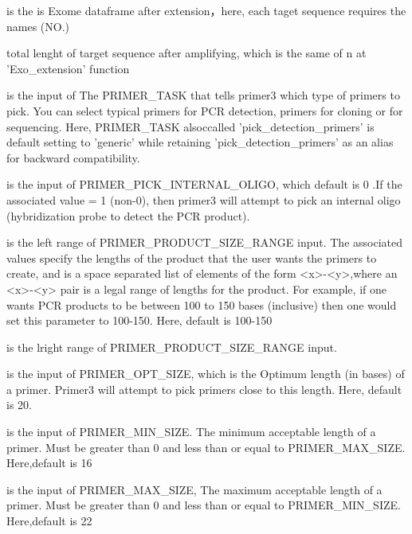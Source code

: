 \documentclass[a4paper]{book}
\begin{document}
\begin{Arguments}
\begin{ldescription}
\item[\code{x}] is the is Exome dataframe after extension，here, each taget sequence requires the names (NO.)

\item[\code{EX}] total lenght of target sequence after amplifying, which is the same of n at 'Exo\_extension' function

\item[\code{generic}] is the input of The PRIMER\_TASK that tells primer3 which type of primers to pick.
You can select typical primers for PCR detection, primers for cloning or for sequencing. Here,
PRIMER\_TASK alsoccalled 'pick\_detection\_primers' is default setting  to 'generic' while
retaining 'pick\_detection\_primers' as an alias for backward compatibility.

\item[\code{oligo}] is the input of PRIMER\_PICK\_INTERNAL\_OLIGO, which default is 0 .If the associated
value = 1 (non-0), then primer3 will attempt to pick an internal oligo (hybridization probe to
detect the PCR product).

\item[\code{rangel}] is the left range  of PRIMER\_PRODUCT\_SIZE\_RANGE input. The associated values specify the lengths
of the product that the user wants the primers to create, and is a space separated list of elements
of the form <x>-<y>,where an <x>-<y> pair is a legal range of lengths for the product. For example,
if one wants PCR products to be between 100 to 150 bases (inclusive) then one would set this parameter
to 100-150. Here, default is 100-150

\item[\code{ranger}] is the lright  range  of PRIMER\_PRODUCT\_SIZE\_RANGE input.

\item[\code{opt\_size}] is the input of PRIMER\_OPT\_SIZE, which is the Optimum length (in bases) of a primer.
Primer3 will attempt to pick primers close to this length. Here, default is 20.

\item[\code{min\_size}] is the input of PRIMER\_MIN\_SIZE. The minimum acceptable length of a primer.
Must be greater than 0 and less than or equal to PRIMER\_MAX\_SIZE. Here,default is 16

\item[\code{max\_size}] is the input of PRIMER\_MAX\_SIZE, The maximum acceptable length of a primer.
Must be greater than 0 and less than or equal to PRIMER\_MIN\_SIZE. Here,default is 22


\end{ldescription}
\end{Arguments}
\end{document}
